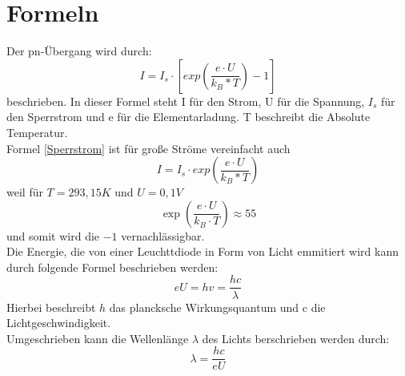 \chapter{Formeln}
    
Der pn-Übergang wird durch:\\
    \begin{equation}
		I=I_s \cdot \left[exp \left(\frac{e\cdot U}{k_B*T} \right) - 1 \right]
        \label{Sperrstrom}
	\end{equation}
beschrieben.  In dieser Formel steht I für den Strom, U für die Spannung, $I_s$ für den Sperrstrom und e für die Elementarladung. T beschreibt die Absolute Temperatur.  \\

  Formel \eqref{Sperrstrom} ist für große Ströme vereinfacht auch 
  \begin{equation}
  	I=I_s \cdot exp \left(\frac{e\cdot U}{k_B*T} \right)
    \label{Sperrstrom-vereinfacht}
  \end{equation}
  weil für $T = 293,15 K$ und $U = 0,1 V$ 
  \begin{equation}
  		 \exp\left(\frac{e\cdot U}{k_B \cdot T} \right) \approx 55
  \end{equation}
  und somit wird die $-1$ vernachlässigbar. \\
  Die Energie, die von einer Leuchttdiode in Form von Licht emmitiert wird kann durch folgende Formel beschrieben werden:  \\ 
  
    \begin{equation}
		eU=hv=\frac{hc}{\lambda}
	\end{equation}
Hierbei beschreibt $h$ das plancksche Wirkungsquantum und c die Lichtgeschwindigkeit.
\\
Umgeschrieben kann die  Wellenlänge $\lambda$ des Lichts berschrieben werden durch:\\

    \begin{equation}
\lambda= \frac{hc}{eU}
\end{equation}


	\pagebreak
